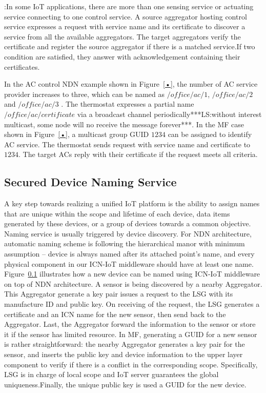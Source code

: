 \vspace{1mm}:In some IoT applications, there are more than one sensing service or actuating service connecting to one control service. A source aggregator hosting control service expresses a request with service name and its certificate to discover a service from all the available aggregators. The target aggregators verify the certificate and register the source   aggregator if there is a matched service.If two condition are satisfied, they answer with acknowledgement containing their certificates.

In the AC control NDN example shown in Figure~\ref{•}, the number of AC service provider increases to three, which can be named as $/office/ac/1$, $/office/ac/2$ and $/office/ac/3$ . The thermostat expresses a partial name $/office/ac/certificate$ via a broadcast channel periodically***LS:without interest multicast, some node will no receive the message forever***. In the MF case shown in Figure~\ref{•}, a multicast group GUID $1234$ can be assigned to identify AC service. The thermostat sends request with service name and certificate to $1234$. The target ACs reply with their certificate if the request meets all criteria.

\subsection{Secured Device Naming Service}
A key step towards realizing a unified IoT platform is the ability to assign names that are unique within the scope and lifetime of each device, data items generated by these devices, or a group of devices towards a common objective. Naming service is usually triggered by device discovery. For NDN architecture, automatic naming scheme is following the hierarchical manor with minimum assumption -- device is always named after its attached point's name, and every physical component in our ICN-IoT middleware should have at least one name. Figure~\ref{} illustrates how a new device can be named using ICN-IoT middleware on top of NDN architecture. A sensor is being discovered by a nearby Aggregator. This Aggregator generate a key pair issues a request to the LSG with its manufacture ID and public key. On receiving of the request, the LSG generates a certificate and an ICN name for the new sensor, then send back to the Aggregator. Last, the Aggregator forward the information to the sensor or store it if the sensor has limited resource. In MF, generating a GUID for a new sensor is rather straightforward: the nearby Aggregator generates a key pair for the sensor, and inserts the public key and device information to the upper layer component to verify if there is a conflict in the corresponding scope. Specifically, LSG is in charge of local scope and IoT server guarantees the global uniqueness.Finally, the unique public key is used a GUID for the new device.



